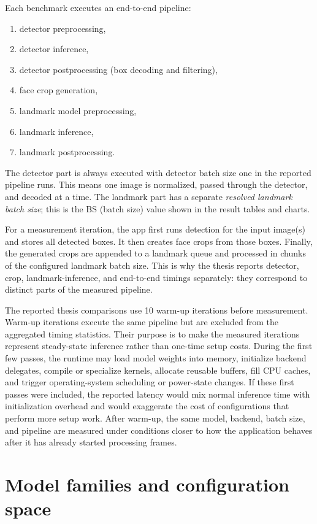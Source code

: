 Each benchmark executes an end-to-end pipeline:
\begin{enumerate}
    \item detector preprocessing,
    \item detector inference,
    \item detector postprocessing (box decoding and filtering),
    \item face crop generation,
    \item landmark model preprocessing,
    \item landmark inference,
    \item landmark postprocessing.
\end{enumerate}

The detector part is always executed with detector batch size one in the reported
pipeline runs. This means one image is normalized, passed through the detector,
and decoded at a time. The landmark part has a separate \emph{resolved landmark
batch size}; this is the BS (batch size) value shown in the result tables and charts.

For a measurement iteration, the app first runs detection for the input image(s) and
stores all detected boxes. It then creates face crops from those boxes. Finally,
the generated crops are appended to a landmark queue and processed in chunks of
the configured landmark batch size. This is why the thesis reports detector, crop, 
landmark-inference, and end-to-end timings separately: they correspond to distinct 
parts of the measured pipeline.

The reported thesis comparisons use 10 warm-up iterations before measurement.
Warm-up iterations execute the same pipeline but are excluded from the aggregated
timing statistics. Their purpose is to make the measured iterations represent
steady-state inference rather than one-time setup costs. During the first few
passes, the runtime may load model weights into memory, initialize backend
delegates, compile or specialize kernels, allocate reusable buffers, fill CPU
caches, and trigger operating-system scheduling or power-state changes. If these
first passes were included, the reported latency would mix normal inference time
with initialization overhead and would exaggerate the cost of configurations that
perform more setup work. After warm-up, the same model, backend, batch size, and
pipeline are measured under conditions closer to how the application behaves
after it has already started processing frames.

\section{Model families and configuration space}

